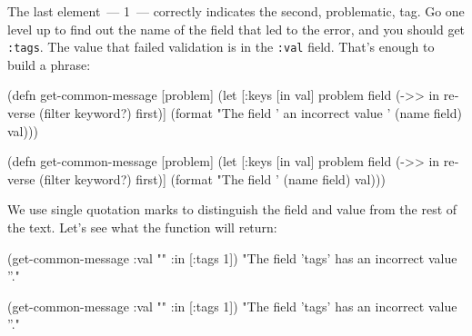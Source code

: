 \fi

The last element~--- 1~--- correctly indicates the second, problematic, tag. Go one level up to find out the name of the field that led to the error, and you should get \verb|:tags|. The value that failed validation is in the \verb|:val| field. That's enough to build a phrase:

\ifx\DEVICETYPE\MOBILE

\begin{english}
  \begin{clojure}
(defn get-common-message
  [problem]
  (let [{:keys [in val]} problem
        field (->> in
                   reverse
                   (filter keyword?)
                   first)]
    (format
      "The field '%
                an incorrect value '%
      (name field) val)))
  \end{clojure}
\end{english}

\else

\begin{english}
  \begin{clojure}
(defn get-common-message
  [problem]
  (let [{:keys [in val]} problem
        field (->> in
                   reverse
                   (filter keyword?)
                   first)]
    (format "The field '%
            (name field) val)))
  \end{clojure}
\end{english}

\fi

We use single quotation marks to distinguish the field and value from the rest of the text. Let's see what the function will return:

\ifx\DEVICETYPE\MOBILE

\begin{english}
  \begin{clojure}
(get-common-message
  {:val "" :in [:tags 1]})
"The field 'tags' has
          an incorrect value ''."
  \end{clojure}
\end{english}

\else

\begin{english}
  \begin{clojure}
(get-common-message {:val "" :in [:tags 1]})
"The field 'tags' has an incorrect value ''."
  \end{clojure}
\end{english}

